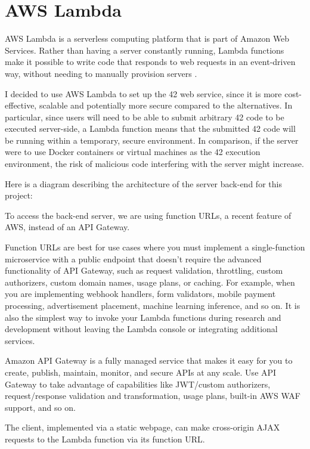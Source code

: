 \section{AWS Lambda}

AWS Lambda is a serverless computing platform that is part of Amazon Web Services. Rather than having a server constantly running, Lambda functions make it possible to write code that responds to web requests in an event-driven way, without needing to manually provision servers \cite{amazon-web-services-inc-2022A}.

I decided to use AWS Lambda to set up the 42 web service, since it is more cost-effective, scalable and potentially more secure compared to the alternatives. In particular, since users will need to be able to submit arbitrary 42 code to be executed server-side, a Lambda function means that the submitted 42 code will be running within a temporary, secure environment. In comparison, if the server were to use Docker containers or virtual machines as the 42 execution environment, the risk of malicious code interfering with the server might increase.

Here is a diagram describing the architecture of the server back-end for this project:


To access the back-end server, we are using function URLs, a recent feature of AWS, instead of an API Gateway.

Function URLs are best for use cases where you must implement a single-function microservice with a public endpoint that doesn't require the advanced functionality of API Gateway, such as request validation, throttling, custom authorizers, custom domain names, usage plans, or caching. For example, when you are implementing webhook handlers, form validators, mobile payment processing, advertisement placement, machine learning inference, and so on. It is also the simplest way to invoke your Lambda functions during research and development without leaving the Lambda console or integrating additional services.

Amazon API Gateway is a fully managed service that makes it easy for you to create, publish, maintain, monitor, and secure APIs at any scale. Use API Gateway to take advantage of capabilities like JWT/custom authorizers, request/response validation and transformation, usage plans, built-in AWS WAF support, and so on. \cite{casalboni-2022}

The client, implemented via a static webpage, can make cross-origin AJAX requests to the Lambda function via its function URL.

